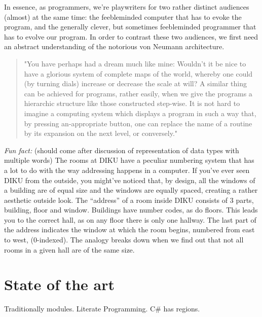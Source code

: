 In essence, as programmers, we're playwriters for two rather distinct audiences
(almost) at the same time: the feebleminded computer that has to evoke the
program, and the generally clever, but sometimes feebleminded programmer that
has to evolve our program. In order to contrast these two audiences, we first
need an abstract understanding of the notorious von Neumann architecture.







\begin{quote}"You have perhaps had a dream much like mine: Wouldn't it be nice
to have a glorious system of complete maps of the world, whereby one could (by
turning dials) increase or decrease the scale at will? A similar thing can be
achieved for programs, rather easily, when we give the programs a hierarchic
structure like those constructed step-wise. It is not hard to imagine a
computing system which displays a program in such a way that, by pressing
an-appropriate button, one can replace the name of a routine by its expansion
on the next level, or conversely."\cite{knuth-review-of-sp}\end{quote}

\emph{Fun fact:} (should come after discussion of representation of data types
with multiple words) The rooms at DIKU have a peculiar numbering system that
has a lot to do with the way addressing happens in a computer. If you've ever
seen DIKU from the outside, you might've noticed that, by design, all the
windows of a building are of equal size and the windows are equally spaced,
creating a rather aesthetic outside look. The ``address'' of a room inside DIKU
consists of 3 parts, building, floor and window. Buildings have number codes,
as do floors. This leads you to the correct hall, as on any floor there is only
one hallway. The last part of the address indicates the window at which the
room begins, numbered from east to west, (0-indexed). The analogy breaks down
when we find out that not all rooms in a given hall are of the same size.



\section{State of the art}

Traditionally modules. Literate Programming. C\# has regions.




